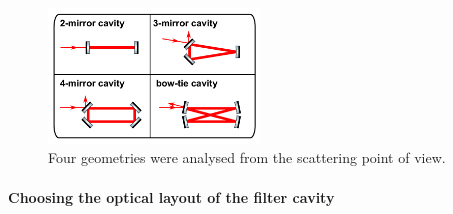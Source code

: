\FloatBarrier
\begin{figure}[htb]
\centering
\includegraphics[width=0.5\textwidth]{./Sec_Optics/cavity-designs.pdf}
\caption{Four geometries were analysed from the scattering point of view.}
\label{fig:sc_geometry}
\end{figure}
\paragraph{Choosing the optical layout of the filter cavity}\label{subsec:fcscattering}


